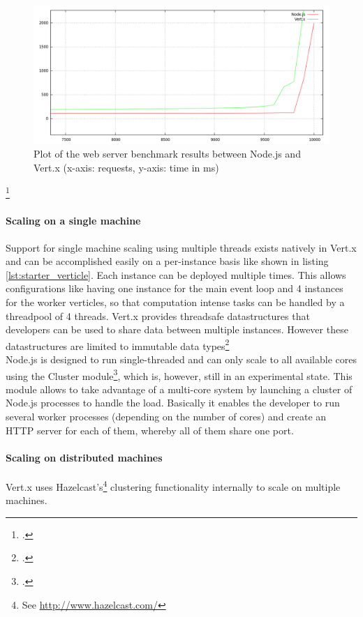 \begin{figure}[htbp]
\centering
\includegraphics[width=\textwidth]{img/200kb_benchmark_node_vertx.png}
\caption[Plot of the web server benchmark results (asynchronous servers)]{Plot of the web server benchmark results between Node.js and Vert.x (x-axis: requests, y-axis: time in ms)}
\label{fig:benchmark_async}
\end{figure}
\footcitetext{req_res}


\paragraph{Scaling on a single machine}
Support for single machine scaling using multiple threads exists natively in
Vert.x and can be accomplished easily on a per-instance basis like shown in listing \ref{lst:starter_verticle}.
Each instance can
be deployed multiple times. This allows configurations like having one instance
for the main event loop and 4 instances for the worker verticles, so that
computation intense tasks can be handled by a threadpool of 4 threads. 
Vert.x provides  threadsafe datastructures that developers can be used to share data between multiple
instances. However these datastructures are limited to immutable data types\footcite[Cf.][]{vertx_2012}\\

Node.js is designed to run single-threaded and can only scale to all available
cores using the Cluster module\footcite[Cf.][]{node_2012b}, which is, however, still in an experimental state.
This module allows to take advantage of a multi-core system by launching a cluster of Node.js processes to handle the load. Basically it enables the developer to run several worker processes (depending on the number of cores) and create an HTTP server for each of them, whereby all of them share one port. 


\paragraph{Scaling on distributed machines}
Vert.x uses Hazelcast's\footnote{See \url{http://www.hazelcast.com/}} clustering
functionality internally to scale on multiple machines.\\

